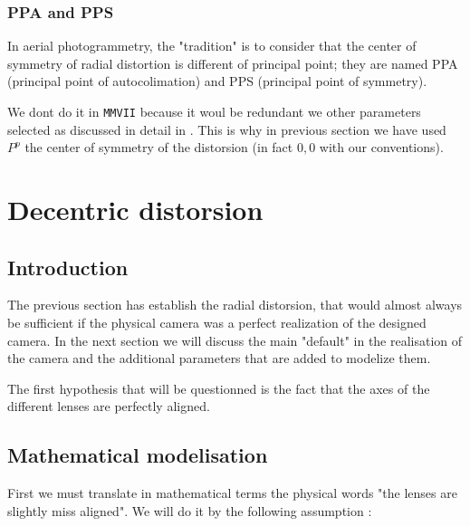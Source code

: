 
\subsubsection{PPA and PPS}

In aerial photogrammetry, the "tradition" is to consider that the center of symmetry of radial distortion
is different of principal point; they are named PPA (principal point of autocolimation) and
PPS (principal point of symmetry).

We dont do it in {\tt MMVII} because it woul be redundant we other parameters 
selected as discussed in detail in \label{PPA:PPS:DEC}.
This is why in previous section we have used $P^p$ the center of symmetry of the distorsion 
(in fact $0,0$ with our conventions).


\section{Decentric distorsion}
\label{DecMod}

\subsection{Introduction}
The previous section has establish the radial distorsion, that would almost always
be sufficient if the physical camera was a perfect realization of the designed camera.
In the next section we will discuss the main "default" in the realisation of
the camera and the additional parameters that are added to modelize them.

The first hypothesis  that will be questionned is the fact that the axes of the different
lenses are perfectly aligned.

\subsection{Mathematical modelisation}

First we must translate in mathematical terms the physical words
"the lenses are slightly miss aligned".
We will do it by  the following assumption :

